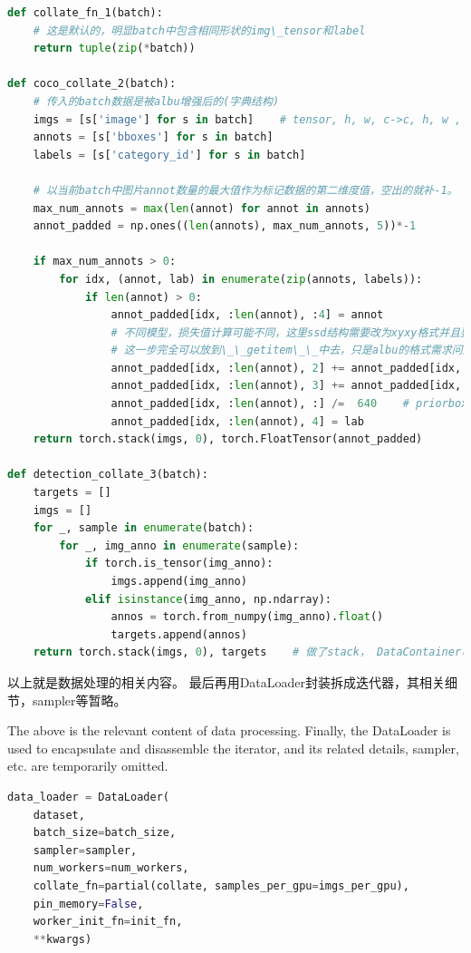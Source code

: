 \documentclass[UTF8]{ctexart}
\begin{document}
\lstset{style=mystyle}
\begin{lstlisting}[language=Python]
def collate_fn_1(batch):
	# 这是默认的，明显batch中包含相同形状的img\_tensor和label
	return tuple(zip(*batch))
	
def coco_collate_2(batch):
	# 传入的batch数据是被albu增强后的(字典结构)
    imgs = [s['image'] for s in batch]    # tensor, h, w, c->c, h, w , handle at transform in __getitem__
    annots = [s['bboxes'] for s in batch]
    labels = [s['category_id'] for s in batch]

	# 以当前batch中图片annot数量的最大值作为标记数据的第二维度值，空出的就补-1。
    max_num_annots = max(len(annot) for annot in annots)
    annot_padded = np.ones((len(annots), max_num_annots, 5))*-1

    if max_num_annots > 0:
        for idx, (annot, lab) in enumerate(zip(annots, labels)):
            if len(annot) > 0:
                annot_padded[idx, :len(annot), :4] = annot
				# 不同模型，损失值计算可能不同，这里ssd结构需要改为xyxy格式并且要做尺度归一化
				# 这一步完全可以放到\_\_getitem\_\_中去，只是albu的格式需求问题。
                annot_padded[idx, :len(annot), 2] += annot_padded[idx, :len(annot), 0]    #  xywh-->x1,y1,x2,y2 for general box,ssd target assigner
                annot_padded[idx, :len(annot), 3] += annot_padded[idx, :len(annot), 1]    # contains padded -1 label
                annot_padded[idx, :len(annot), :] /=  640    # priorbox for ssd primary target assinger
                annot_padded[idx, :len(annot), 4] = lab
	return torch.stack(imgs, 0), torch.FloatTensor(annot_padded)
	
def detection_collate_3(batch):
    targets = []
    imgs = []
    for _, sample in enumerate(batch):
        for _, img_anno in enumerate(sample):
            if torch.is_tensor(img_anno):
                imgs.append(img_anno)
            elif isinstance(img_anno, np.ndarray):
                annos = torch.from_numpy(img_anno).float()
                targets.append(annos)
    return torch.stack(imgs, 0), targets    # 做了stack， DataContainer可以不做stack
\end{lstlisting}

以上就是数据处理的相关内容。
最后再用DataLoader封装拆成迭代器，其相关细节，sampler等暂略。

The above is the relevant content of data processing. Finally, the DataLoader is used to encapsulate 
and disassemble the iterator, and its related details, sampler, etc. are temporarily omitted.

\lstset{style=mystyle}
\begin{lstlisting}[language=Python]
data_loader = DataLoader(
	dataset,
	batch_size=batch_size,
	sampler=sampler,
	num_workers=num_workers,
	collate_fn=partial(collate, samples_per_gpu=imgs_per_gpu),
	pin_memory=False,
	worker_init_fn=init_fn,
	**kwargs)
\end{lstlisting}
\end{document}
